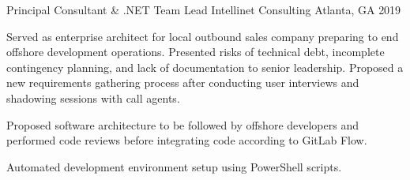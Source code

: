 \begin{cventries}
  \cventry
    {Principal Consultant \& .NET Team Lead} %
    {Intellinet Consulting} %
    {Atlanta, GA} %
    {2019} %
    {
      \begin{cvitems} %
        \item {Served as enterprise architect for local outbound sales company preparing to end offshore development operations. Presented risks of technical debt, incomplete contingency planning, and lack of documentation to senior leadership. Proposed a new requirements gathering process after conducting user interviews and shadowing sessions with call agents.}
        \item {Proposed software architecture to be followed by offshore developers and performed code reviews before integrating code according to GitLab Flow.}
        \item {Automated development environment setup using PowerShell scripts.}
      \end{cvitems}
    }


\end{cventries}
